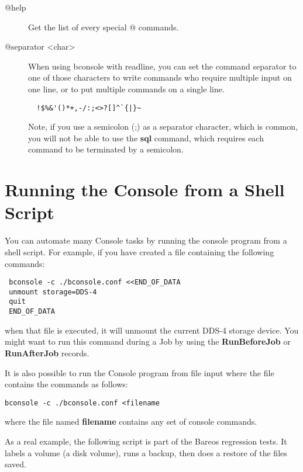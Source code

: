 \begin{description}
\item [@help]
   Get the list of every special @ commands.

\item [@separator {\textless}char{\textgreater}]
  When using bconsole with readline, you can set the command separator to one
  of those characters to write commands who require multiple input on one line,
  or to put multiple commands on a single line.
\begin{verbatim}
  !$%&'()*+,-/:;<>?[]^`{|}~
\end{verbatim}

  Note, if you use a semicolon (;) as a separator character, which is
  common, you will not be able to use the {\bf sql} command, which
  requires each command to be terminated by a semicolon.

\end{description}

\section{Running the Console from a Shell Script}
\label{scripting}

You can automate many Console tasks by running the console program from a
shell script. For example, if you have created a file containing the following
commands:

\footnotesize
\begin{verbatim}
 bconsole -c ./bconsole.conf <<END_OF_DATA
 unmount storage=DDS-4
 quit
 END_OF_DATA
\end{verbatim}
\normalsize

when that file is executed, it will unmount the current DDS-4 storage device.
You might want to run this command during a Job by using the {\bf
RunBeforeJob} or {\bf RunAfterJob} records.

It is also possible to run the Console program from file input where the file
contains the commands as follows:

\footnotesize
\begin{verbatim}
bconsole -c ./bconsole.conf <filename
\end{verbatim}
\normalsize

where the file named {\bf filename} contains any set of console commands.

As a real example, the following script is part of the Bareos regression
tests. It labels a volume (a disk volume), runs a backup, then does a restore
of the files saved.

